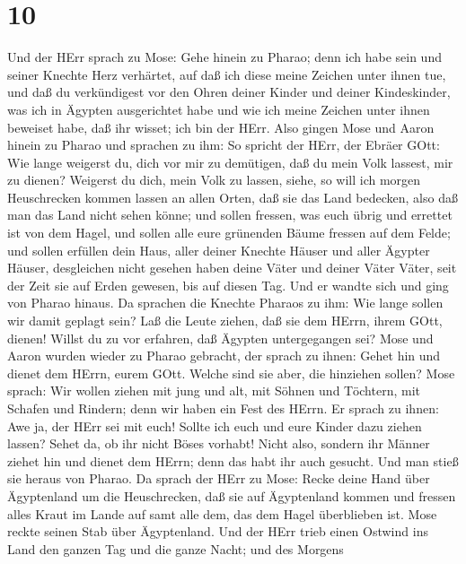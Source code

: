 \hypertarget{section-9}{%
\section{10}\label{section-9}}

 Und der HErr sprach zu Mose: Gehe hinein zu Pharao; denn
ich habe sein und seiner Knechte Herz verhärtet, auf daß ich diese meine
Zeichen unter ihnen tue,  und daß du verkündigest vor den
Ohren deiner Kinder und deiner Kindeskinder, was ich in Ägypten
ausgerichtet habe und wie ich meine Zeichen unter ihnen beweiset habe,
daß ihr wisset; ich bin der HErr.  Also gingen Mose und
Aaron hinein zu Pharao und sprachen zu ihm: So spricht der HErr, der
Ebräer GOtt: Wie lange weigerst du, dich vor mir zu demütigen, daß du
mein Volk lassest, mir zu dienen?  Weigerst du dich, mein
Volk zu lassen, siehe, so will ich morgen Heuschrecken kommen lassen an
allen Orten,  daß sie das Land bedecken, also daß man das
Land nicht sehen könne; und sollen fressen, was euch übrig und errettet
ist von dem Hagel, und sollen alle eure grünenden Bäume fressen auf dem
Felde;  und sollen erfüllen dein Haus, aller deiner Knechte
Häuser und aller Ägypter Häuser, desgleichen nicht gesehen haben deine
Väter und deiner Väter Väter, seit der Zeit sie auf Erden gewesen, bis
auf diesen Tag. Und er wandte sich und ging von Pharao hinaus.
 Da sprachen die Knechte Pharaos zu ihm: Wie lange sollen
wir damit geplagt sein? Laß die Leute ziehen, daß sie dem HErrn, ihrem
GOtt, dienen! Willst du zu vor erfahren, daß Ägypten untergegangen sei?
 Mose und Aaron wurden wieder zu Pharao gebracht, der sprach
zu ihnen: Gehet hin und dienet dem HErrn, eurem GOtt. Welche sind sie
aber, die hinziehen sollen?  Mose sprach: Wir wollen ziehen
mit jung und alt, mit Söhnen und Töchtern, mit Schafen und Rindern; denn
wir haben ein Fest des HErrn.  Er sprach zu ihnen: Awe ja,
der HErr sei mit euch! Sollte ich euch und eure Kinder dazu ziehen
lassen? Sehet da, ob ihr nicht Böses vorhabt!  Nicht also,
sondern ihr Männer ziehet hin und dienet dem HErrn; denn das habt ihr
auch gesucht. Und man stieß sie heraus von Pharao.  Da
sprach der HErr zu Mose: Recke deine Hand über Ägyptenland um die
Heuschrecken, daß sie auf Ägyptenland kommen und fressen alles Kraut im
Lande auf samt alle dem, das dem Hagel überblieben ist. 
Mose reckte seinen Stab über Ägyptenland. Und der HErr trieb einen
Ostwind ins Land den ganzen Tag und die ganze Nacht; und des Morgens
